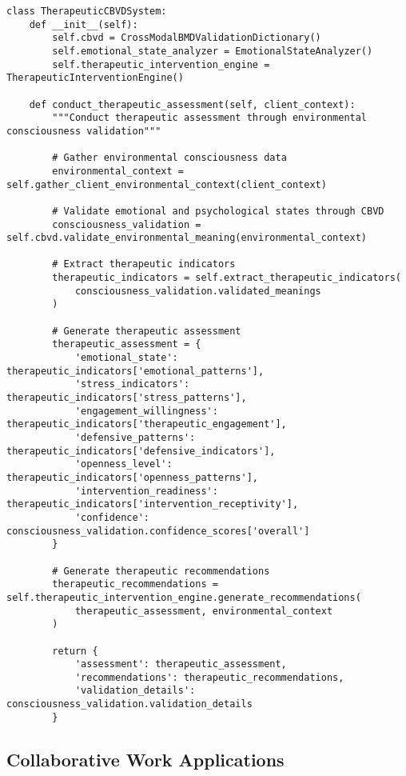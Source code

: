 \documentclass[12pt,a4paper]{article}
\begin{document}
\begin{lstlisting}[style=pythonstyle, caption=Therapeutic CBVD Application]
class TherapeuticCBVDSystem:
    def __init__(self):
        self.cbvd = CrossModalBMDValidationDictionary()
        self.emotional_state_analyzer = EmotionalStateAnalyzer()
        self.therapeutic_intervention_engine = TherapeuticInterventionEngine()
        
    def conduct_therapeutic_assessment(self, client_context):
        """Conduct therapeutic assessment through environmental consciousness validation"""
        
        # Gather environmental consciousness data
        environmental_context = self.gather_client_environmental_context(client_context)
        
        # Validate emotional and psychological states through CBVD
        consciousness_validation = self.cbvd.validate_environmental_meaning(environmental_context)
        
        # Extract therapeutic indicators
        therapeutic_indicators = self.extract_therapeutic_indicators(
            consciousness_validation.validated_meanings
        )
        
        # Generate therapeutic assessment
        therapeutic_assessment = {
            'emotional_state': therapeutic_indicators['emotional_patterns'],
            'stress_indicators': therapeutic_indicators['stress_patterns'],
            'engagement_willingness': therapeutic_indicators['therapeutic_engagement'],
            'defensive_patterns': therapeutic_indicators['defensive_indicators'],
            'openness_level': therapeutic_indicators['openness_patterns'],
            'intervention_readiness': therapeutic_indicators['intervention_receptivity'],
            'confidence': consciousness_validation.confidence_scores['overall']
        }
        
        # Generate therapeutic recommendations
        therapeutic_recommendations = self.therapeutic_intervention_engine.generate_recommendations(
            therapeutic_assessment, environmental_context
        )
        
        return {
            'assessment': therapeutic_assessment,
            'recommendations': therapeutic_recommendations,
            'validation_details': consciousness_validation.validation_details
        }
\end{lstlisting}

\subsection{Collaborative Work Applications}
\end{document}
